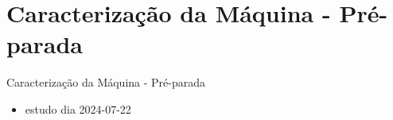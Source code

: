 \section{Caracterização da Máquina - Pré-parada}



\begin{frame}{Caracterização da Máquina - Pré-parada}

{\footnotesize
\begin{itemize}
    \item estudo dia 2024-07-22
\end{itemize}
}
\end{frame}
